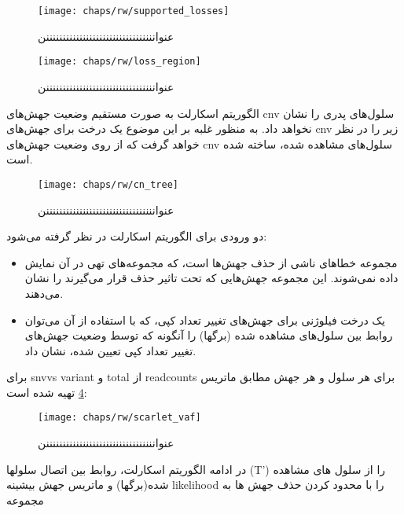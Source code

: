 \begin{figure}[!ht]
	\centerline{\texttt{[image: chaps/rw/supported\_losses]}}
	\caption{عنوانننننننننننننننننننننننننننننننننن}
	\label{fig:ch_rw:supported_losses}
\end{figure}

\begin{figure}[!ht]
	\centerline{\texttt{[image: chaps/rw/loss\_region]}}
	\caption{عنوانننننننننننننننننننننننننننننننننن}
	\label{fig:ch_rw:loss_region}
\end{figure}


الگوریتم اسکارلت به صورت مستقیم وضعیت جهش‌های \gls{cnv} سلول‌های پدری را نشان نخواهد داد. به منظور غلبه بر این موضوع یک درخت برای جهش‌های \gls{cnv} زیر را در نظر خواهد گرفت که از روی وضعیت جهش‌های \gls{cnv} سلو‌‌ل‌های مشاهده شده، ساخته شده است. 


\begin{figure}[!ht]
	\centerline{\texttt{[image: chaps/rw/cn\_tree]}}
	\caption{عنوانننننننننننننننننننننننننننننننننن}
	\label{fig:ch_rw:cn_tree}
\end{figure}


دو ورودی برای الگوریتم اسکارلت در نظر گرفته می‌شود: 
\begin{itemize}
	\item مجموعه خطاهای ناشی از حذف جهش‌ها است، که مجموعه‌های تهی در آن نمایش داده نمی‌شوند. این مجموعه جهش‌هایی که تحت تاثیر حذف قرار می‌گیرند را نشان می‌دهند. 
	\item یک درخت فیلوژنی برای جهش‌های تغییر تعداد کپی، که با استفاده از آن می‌توان روابط بین سلول‌های مشاهده شده (برگها) را آنگونه که توسط وضعیت جهش‌های تغییر تعداد کپی تعیین شده، نشان داد.
\end{itemize}


 

  

برای \glspl{snvv} \gls{variant}   و  \gls{total}   از  \gls{readcounts} برای هر سلول و هر جهش مطابق ماتریس \ref{fig:ch_rw:scarlet_vaf} تهیه شده است: 

\begin{figure}[!ht]
	\centerline{\texttt{[image: chaps/rw/scarlet\_vaf]}}
	\caption{عنوانننننننننننننننننننننننننننننننننن}
	\label{fig:ch_rw:scarlet_vaf}
\end{figure}


در ادامه  الگوریتم اسکارلت، روابط بین اتصال سلولها (T’) را  از سلول های مشاهده شده(برگها) و ماتریس جهش بیشینه \gls{likelihood}  را با محدود کردن حذف جهش ها به مجموعه

